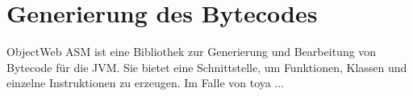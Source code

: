 \chapter{Generierung des Bytecodes}
\label{cha:asm}

ObjectWeb ASM ist eine Bibliothek zur Generierung und Bearbeitung von Bytecode für die JVM. Sie bietet eine Schnittstelle, um Funktionen, Klassen und einzelne Instruktionen zu erzeugen. Im Falle von toya ...